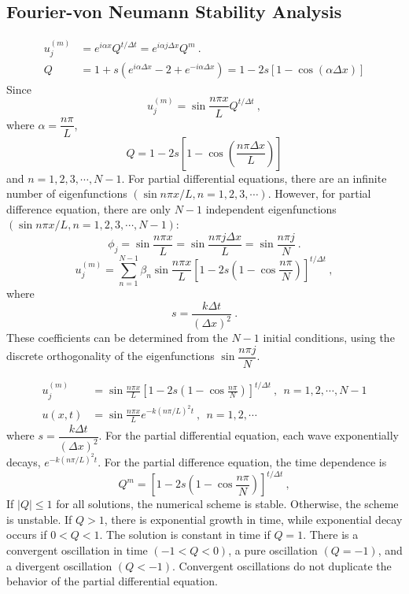 \documentclass[12pt,a4paper]{article}
\begin{document}
\subsection{Fourier-von Neumann Stability Analysis}
\begin{align*}
u_j^{(m)} &= e^{i\alpha x} Q^{t/\Delta t} = e^{i\alpha j \Delta x} Q^m ~. \\
Q &= 1 +s(e^{i\alpha \Delta x} -2 +e^{-i\alpha \Delta x}) = 1-2s\left[1-\cos \left(\alpha \Delta x \right) \right]
\end{align*}
Since
\begin{equation*}
u_j^{(m)} = \sin \frac{n\pi x}{L} Q^{t/\Delta t} ~,
\end{equation*}
where $\alpha = \dfrac{n\pi}{L}$,
\begin{equation}
Q = 1-2s \left[1-\cos \left( \frac{n\pi \Delta x}{L} \right) \right]
\end{equation}
and $n =1, 2, 3, \cdots, N-1$. For partial differential equations, there are an infinite number of eigenfunctions $(\sin n\pi x/L, n=1, 2, 3,\cdots)$. However,  for partial difference equation, there are only $N-1$ independent eigenfunctions $(\sin n\pi x/L, n=1, 2, 3, \cdots, N-1)$:
\begin{equation}
\phi_j = \sin \frac{n\pi x}{L} = \sin \frac{n\pi j \Delta x}{L} = \sin \frac{n\pi j}{N} ~.
\end{equation}
\begin{equation}
u_j^{(m)} = \sum_{n=1}^{N-1} \beta_n \sin \frac{n\pi x}{L} \left[1-2s \left(1-\cos \frac{n\pi}{N}\right) \right]^{t/\Delta t} ~,
\end{equation}
where 
\begin{equation*}
s = \frac{k\Delta t}{(\Delta x)^2} ~.
\end{equation*}
These coefficients can be determined from the $N-1$ initial conditions, using the discrete orthogonality of the eigenfunctions $\sin \dfrac{n\pi j}{N}$.

\begin{align}
u_j^{(m)} &= \sin \frac{n\pi x}{L} \left[1-2s \left(1-\cos \frac{n\pi}{N}\right) \right]^{t/\Delta t} ~, ~~ n= 1, 2, \cdots, N-1\\
u(x, t) &= \sin \frac{n\pi x}{L} e^{-k(n\pi/L)^2 t} ~, ~~ n=1, 2, \cdots
\end{align}
where $s = \dfrac{k\Delta t}{(\Delta x)^2}$. For the partial differential equation, each wave exponentially decays, $e^{-k(n\pi/L)^2 t}$. For the partial difference equation, the time dependence is
\begin{equation}
Q^m = \left[1-2s \left(1-\cos \frac{n\pi}{N}\right) \right]^{t/\Delta t} ~,
\end{equation}
If $|Q| \leqslant 1$ for all solutions, the numerical scheme is stable. Otherwise, the scheme is unstable. If $Q>1$, there is exponential growth in time, while exponential decay occurs if $0<Q<1$. The solution is constant in time if $Q=1$. There is a convergent oscillation in time $(-1< Q<0)$, a pure oscillation $(Q=-1)$, and a divergent oscillation $(Q<-1)$. Convergent oscillations do not  duplicate the behavior of the partial differential equation. 
\end{document}
